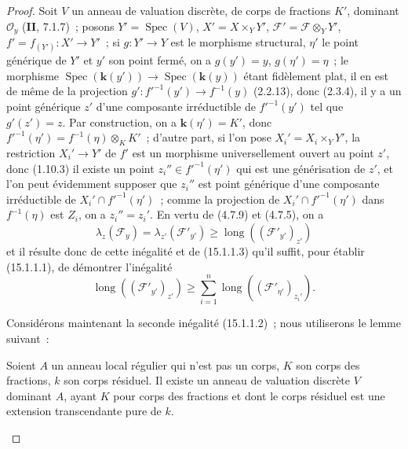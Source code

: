 \begin{proof}
Soit $V$ un anneau de valuation discrète, de corps de fractions $K'$, dominant
$\mathcal O_y$ (\textbf{II}, 7.1.7)~; posons $Y'=\operatorname{Spec}(V)$,
$X'=X\times_Y Y'$, $\mathcal F'=\mathcal F\otimes_Y Y'$,
$f'=f_{(Y')}:X'\to Y'$~; si $g:Y'\to Y$ est le morphisme structural, $\eta'$ le
point générique de $Y'$ et $y'$ son point fermé, on a $g(y')=y$, $g(\eta')=\eta$~;
le morphisme $\operatorname{Spec}(\mathbf{k}(y'))\to
\operatorname{Spec}(\mathbf{k}(y))$ étant fidèlement plat, il en est de même de
la projection $g':f'^{-1}(y')\to f^{-1}(y)$ (2.2.13), donc (2.3.4), il y a un
point générique $z'$ d'une composante irréductible de $f'^{-1}(y')$ tel que
$g'(z')=z$. Par construction, on a $\mathbf{k}(\eta')=K'$, donc
$f'^{-1}(\eta')=f^{-1}(\eta)\otimes_K K'$~; d'autre part, si l'on pose
$X_i'=X_i\times_Y Y'$, la restriction $X_i'\to Y'$ de $f'$ est un morphisme
universellement ouvert au point $z'$, donc (1.10.3) il existe un point
$z_i''\in f'^{-1}(\eta')$ qui est une générisation de $z'$, et l'on peut
évidemment supposer que $z_i''$ est point générique d'une composante
irréductible de $X_i'\cap f'^{-1}(\eta')$~; comme la projection de
$X_i'\cap f'^{-1}(\eta')$ dans $f^{-1}(\eta)$ est $Z_i$, on a $z_i''=z_i'$.
En vertu de (4.7.9) et (4.7.5), on a
\[
\tag{15.1.1.4}
\label{IV.15.1.1.4-fr}
  \lambda_z(\mathcal F_y)=\lambda_{z'}(\mathcal F'_{y'})
  \geqslant\operatorname{long}((\mathcal F'_{y'})_{z'})
\]
et il résulte donc de cette inégalité et de (15.1.1.3) qu'il suffit, pour établir
(15.1.1.1), de démontrer l'inégalité
\[
\tag{15.1.1.5}
\label{IV.15.1.1.5-fr}
  \operatorname{long}((\mathcal F'_{y'})_{z'})\geqslant
  \sum_{i=1}^{n}\operatorname{long}((\mathcal F'_{\eta'})_{z_i'}).
\]

Considérons maintenant la seconde inégalité (15.1.1.2)~; nous utiliserons le
lemme suivant~:

\begin{lemma}[15.1.1.6]
\label{IV.15.1.1.6-fr}
Soient $A$ un anneau local régulier qui n'est pas un corps, $K$ son corps des
fractions, $k$ son corps résiduel. Il existe un anneau de valuation discrète $V$
dominant $A$, ayant $K$ pour corps des fractions et dont le corps résiduel est
une extension transcendante pure de $k$.
\end{lemma}


\end{proof}
